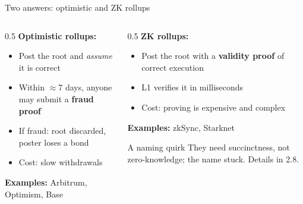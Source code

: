 \ifdefined\PRESENTATION\else\PassOptionsToClass{handout}{beamer}\fi\documentclass[aspectratio=169, lualatex]{beamer}
\begin{document}
\begin{frame}{Two answers: optimistic and ZK rollups}
	\begin{columns}[c]
		\begin{column}{0.5\textwidth}
			\textbf{Optimistic rollups:}
			\begin{itemize}
				\item Post the root and \emph{assume} it is correct
				\item Within $\approx$7 days, anyone may submit a \textbf{fraud proof}
				\item If fraud: root discarded, poster loses a bond
				\item Cost: slow withdrawals
			\end{itemize}
			\textbf{Examples:} Arbitrum, Optimism, Base
		\end{column}
		\begin{column}{0.5\textwidth}
			\textbf{ZK rollups:}
			\begin{itemize}
				\item Post the root with a \textbf{validity proof} of correct execution
				\item L1 verifies it in milliseconds
				\item Cost: proving is expensive and complex
			\end{itemize}
			\textbf{Examples:} zkSync, Starknet
			\begin{alertblock}{A naming quirk}
				They need succinctness, not zero-knowledge; the name stuck. Details in 2.8.
			\end{alertblock}
		\end{column}
	\end{columns}
\end{frame}
\end{document}
